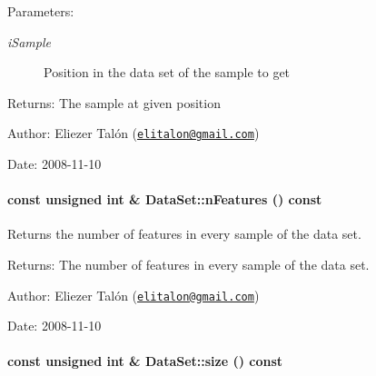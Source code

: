 \begin{Desc}
\item[Parameters:]
\begin{description}
\item[{\em iSample}]Position in the data set of the sample to get\end{description}
\end{Desc}
\begin{Desc}
\item[Returns:]The sample at given position\end{Desc}
\begin{Desc}
\item[Author:]Eliezer Talón (\href{mailto:elitalon@gmail.com}{\tt elitalon@gmail.com}) \end{Desc}
\begin{Desc}
\item[Date:]2008-11-10 \end{Desc}
\hypertarget{class_data_set_a4249f02ed870b2e76f0e73728229be2}{
\paragraph[{nFeatures}]{\setlength{\rightskip}{0pt plus 5cm}const unsigned int \& DataSet::nFeatures () const}\hfill}
\label{class_data_set_a4249f02ed870b2e76f0e73728229be2}


Returns the number of features in every sample of the data set. 

\begin{Desc}
\item[Returns:]The number of features in every sample of the data set.\end{Desc}
\begin{Desc}
\item[Author:]Eliezer Talón (\href{mailto:elitalon@gmail.com}{\tt elitalon@gmail.com}) \end{Desc}
\begin{Desc}
\item[Date:]2008-11-10 \end{Desc}
\hypertarget{class_data_set_805d7628a3ee31a4d4278deba91c0bbf}{
\paragraph[{size}]{\setlength{\rightskip}{0pt plus 5cm}const unsigned int \& DataSet::size () const}\hfill}
\label{class_data_set_805d7628a3ee31a4d4278deba91c0bbf}



